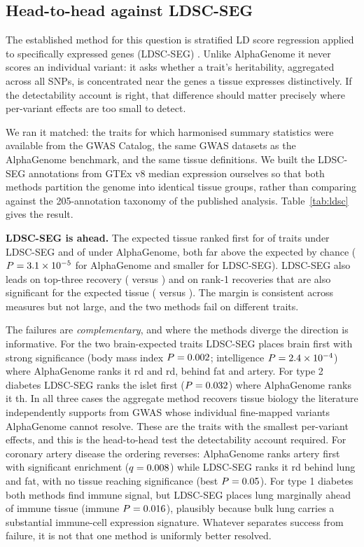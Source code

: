 \documentclass[11pt]{article}
\begin{document}
\subsection{Head-to-head against LDSC-SEG}\label{sec:ldsc}

The established method for this question is stratified LD score regression applied to
specifically expressed genes (LDSC-SEG) \citep{finucane2018seg}. Unlike AlphaGenome it
never scores an individual variant: it asks whether a trait's heritability, aggregated
across all SNPs, is concentrated near the genes a tissue expresses distinctively. If the
detectability account is right, that difference should matter precisely where per-variant
effects are too small to detect.

We ran it matched: the \NMATCH{} traits for which harmonised summary statistics were
available from the GWAS Catalog, the same GWAS datasets as the AlphaGenome benchmark, and
the same \NTISSUE{} tissue definitions. We built the LDSC-SEG annotations from GTEx v8 median
expression ourselves so that both methods partition the genome into identical tissue
groups, rather than comparing against the 205-annotation taxonomy of the published
analysis. Table~\ref{tab:ldsc} gives the result.

\textbf{LDSC-SEG is ahead.} The expected tissue ranked first for \LDONE{} of \NMATCH{}
traits under LDSC-SEG and \AGONE{} of \NMATCH{} under AlphaGenome, both far above the
\CHANCEMATCH{} expected by chance ($P = 3.1\times 10^{-5}$ for AlphaGenome and smaller for
LDSC-SEG). LDSC-SEG also leads on top-three recovery (\LDTHREE{} versus \AGTHREE{}) and
on rank-1 recoveries that are also significant for the expected tissue (\LDONESIG{} versus
\AGONESIG{}). The margin is consistent across measures but not large, and the two methods
fail on different traits.

The failures are \emph{complementary}, and where the methods diverge the direction is
informative. For the two brain-expected traits LDSC-SEG places brain first with strong
significance (body mass index $P = 0.002$; intelligence $P = 2.4\times 10^{-4}$) where
AlphaGenome ranks it \BMIAGRANK{}rd and \COGAGRANK{}rd, behind fat and artery. For type 2
diabetes LDSC-SEG ranks the islet first ($P = 0.032$) where AlphaGenome ranks it
\TWODAGRANK{}th. In all three cases the aggregate method recovers tissue biology the
literature independently supports \citep{gaulton2010islet, pasquali2014enhancer,
chiou2021islet} from GWAS whose individual fine-mapped variants AlphaGenome cannot
resolve. These are the traits with the smallest per-variant effects, and this is the
head-to-head test the detectability account required. For coronary artery disease the
ordering reverses: AlphaGenome ranks artery first with significant enrichment
($q = 0.008$) while LDSC-SEG ranks it \CADLDRANK{}rd behind lung and fat, with no tissue
reaching significance (best $P = 0.05$). For type 1 diabetes both methods find
immune signal, but LDSC-SEG places lung marginally ahead of immune tissue (immune
$P = 0.016$), plausibly because bulk lung carries a substantial immune-cell expression
signature. Whatever separates success from failure, it is not that one method is uniformly
better resolved. 
\end{document}
